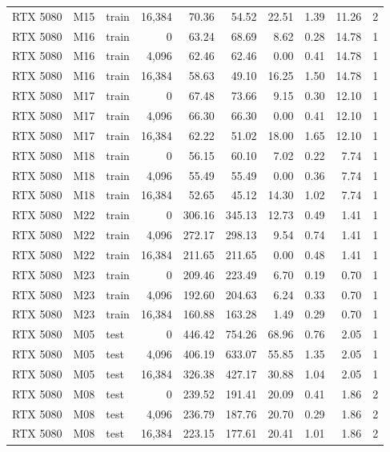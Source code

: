 \documentclass[10pt]{article}
\begin{document}
\begin{landscape}
\begin{longtable}{@{}l l l r r r r r r r@{}}
RTX 5080 & M15 & train & 16,384 & 70.36 & 54.52 & 22.51 & 1.39 & 11.26 & 2 \\
RTX 5080 & M16 & train & 0 & 63.24 & 68.69 & 8.62 & 0.28 & 14.78 & 1 \\
RTX 5080 & M16 & train & 4,096 & 62.46 & 62.46 & 0.00 & 0.41 & 14.78 & 1 \\
RTX 5080 & M16 & train & 16,384 & 58.63 & 49.10 & 16.25 & 1.50 & 14.78 & 1 \\
RTX 5080 & M17 & train & 0 & 67.48 & 73.66 & 9.15 & 0.30 & 12.10 & 1 \\
RTX 5080 & M17 & train & 4,096 & 66.30 & 66.30 & 0.00 & 0.41 & 12.10 & 1 \\
RTX 5080 & M17 & train & 16,384 & 62.22 & 51.02 & 18.00 & 1.65 & 12.10 & 1 \\
RTX 5080 & M18 & train & 0 & 56.15 & 60.10 & 7.02 & 0.22 & 7.74 & 1 \\
RTX 5080 & M18 & train & 4,096 & 55.49 & 55.49 & 0.00 & 0.36 & 7.74 & 1 \\
RTX 5080 & M18 & train & 16,384 & 52.65 & 45.12 & 14.30 & 1.02 & 7.74 & 1 \\
RTX 5080 & M22 & train & 0 & 306.16 & 345.13 & 12.73 & 0.49 & 1.41 & 1 \\
RTX 5080 & M22 & train & 4,096 & 272.17 & 298.13 & 9.54 & 0.74 & 1.41 & 1 \\
RTX 5080 & M22 & train & 16,384 & 211.65 & 211.65 & 0.00 & 0.48 & 1.41 & 1 \\
RTX 5080 & M23 & train & 0 & 209.46 & 223.49 & 6.70 & 0.19 & 0.70 & 1 \\
RTX 5080 & M23 & train & 4,096 & 192.60 & 204.63 & 6.24 & 0.33 & 0.70 & 1 \\
RTX 5080 & M23 & train & 16,384 & 160.88 & 163.28 & 1.49 & 0.29 & 0.70 & 1 \\
RTX 5080 & M05 & test & 0 & 446.42 & 754.26 & 68.96 & 0.76 & 2.05 & 1 \\
RTX 5080 & M05 & test & 4,096 & 406.19 & 633.07 & 55.85 & 1.35 & 2.05 & 1 \\
RTX 5080 & M05 & test & 16,384 & 326.38 & 427.17 & 30.88 & 1.04 & 2.05 & 1 \\
RTX 5080 & M08 & test & 0 & 239.52 & 191.41 & 20.09 & 0.41 & 1.86 & 2 \\
RTX 5080 & M08 & test & 4,096 & 236.79 & 187.76 & 20.70 & 0.29 & 1.86 & 2 \\
RTX 5080 & M08 & test & 16,384 & 223.15 & 177.61 & 20.41 & 1.01 & 1.86 & 2 \\
\end{longtable}
\endgroup
\end{landscape}
\end{document}
